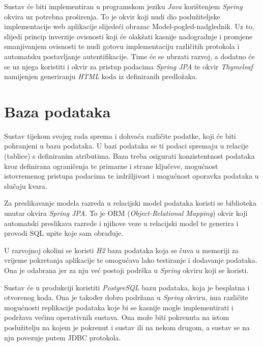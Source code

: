 		Sustav će biti implementiran u programskom jeziku \textit{Java} korištenjem \textit{Spring} okvira uz potrebna proširenja. To je okvir koji nudi dio poslužiteljske implementacije web aplikacije slijedeći obrazac Model-pogled-nadglednik. Uz to, slijedi princip inverzije ovisnosti koji će olakšati kasnije nadogradnje i promjene smanjivanjem ovisnosti te nudi gotovu implementaciju različitih protokola i automatsku postavljanje autentifikacije. Time će se ubrzati razvoj, a dodatno će se uz njega koristiti i okvir za pristup podacima \textit{Spring JPA} te okvir \textit{Thymeleaf} namijenjen generiranju \textit{HTML} koda iz definiranih predložaka.
		
		\eject

		

				
		\section{Baza podataka}
			
%			

		Sustav tijekom svojeg rada sprema i dohvaća različite podatke, koji će biti pohranjeni u bazu podataka. U bazi podataka se ti podaci spremaju u relacije (tablice) s definiranim atributima. Baza treba osigurati konzistentnost podataka kroz definirana ograničenja te primarne i strane ključeve, mogućnost istovremenog pristupa podacima te izdržljivost i mogućnost oporavka podataka u slučaju kvara.
		
		Za preslikavanje modela razreda u relacijski model podataka koristi se biblioteka  unutar okvira \textit{Spring JPA}. To je ORM (\textit{Object-Relational Mapping}) okvir koji automatski preslikava razrede i njihove veze u relacijski model te generira i provodi SQL upite koje sam obrađuje.
		
		U razvojnoj okolini se koristi \textit{H2} baza podataka koja se čuva u memoriji za vrijeme pokretanja aplikacije te omogućava lako testiranje i dodavanje podataka. Ona je odabrana jer za nju već postoji podrška u \textit{Spring} okviru koji se koristi.
		
		Sustav će u produkciji koristiti \textit{PostgreSQL} bazu podataka, koja je besplatna i otvorenog koda. Ona je također dobro podržana u \textit{Spring} okviru, ima različite mogućnosti replikacije podataka koje bi se kasnije mogle implementirati i podržava većinu operativnih sustava. Ona može biti pokrenuta na istom poslužitelju na kojem je pokrenut i sustav ili na nekom drugom, a sustav se na nju povezuje putem JDBC protokola.
		
